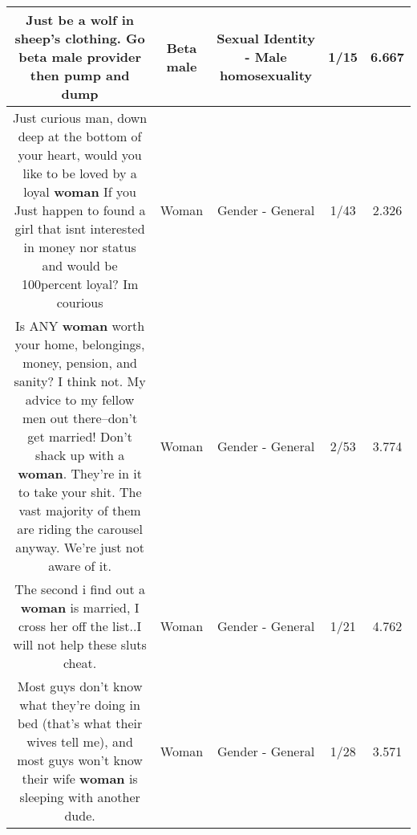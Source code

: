 \documentclass[11pt]{article}
\newlength\mylength
\begin{document}
\begin{center}
\begin{longtable}{|C{.65\mylength}|C{.30\mylength}|C{.12\mylength}|C{.12\mylength}|C{.12\mylength}|}
  \small Just be a wolf in sheep's clothing. Go \textbf{beta male} provider then pump and dump\normalsize   & Beta male & Sexual Identity - Male homosexuality & 1/15 & 6.667 \\  \hline
  \small Just curious man, down deep at the bottom of your heart, would you like to be loved by a loyal \textbf{woman} If you Just happen to found a girl that isnt interested in money nor status and would be 100percent loyal? Im courious\normalsize   & Woman & Gender - General & 1/43 & 2.326 \\  \hline
  \small Is ANY \textbf{woman} worth your home, belongings, money, pension, and sanity?  I think not.  My advice to my fellow men out there--don't get married! Don't shack up with a \textbf{woman}.  They're in it to take your shit.  The vast majority of them are riding the carousel anyway.  We're just not aware of it.\normalsize   & Woman & Gender - General & 2/53 & 3.774 \\  \hline
  \small The second i find out a \textbf{woman} is married, I cross her off the list..I will not help these sluts cheat.\normalsize   & Woman & Gender - General & 1/21 & 4.762 \\  \hline
  \small Most guys don't know what they're doing in bed (that's what their wives tell me), and most guys won't know their wife \textbf{woman} is sleeping with another dude.\normalsize   & Woman & Gender - General & 1/28 & 3.571 \\  \hline

\end{longtable}
\end{center}
\end{document}
